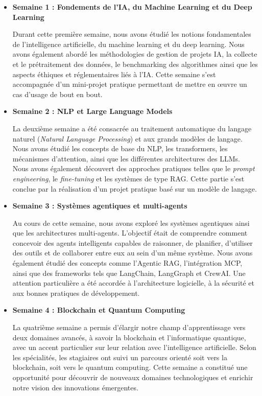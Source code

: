         \begin{itemize}
            \item \textbf{Semaine 1 : Fondements de l’IA, du Machine Learning et du Deep Learning}
        
            Durant cette première semaine, nous avons étudié les notions fondamentales de l’intelligence artificielle, du machine learning et du deep learning. Nous avons également abordé les méthodologies de gestion de projets IA, la collecte et le prétraitement des données, le benchmarking des algorithmes ainsi que les aspects éthiques et réglementaires liés à l’IA. Cette semaine s’est accompagnée d’un mini-projet pratique permettant de mettre en œuvre un cas d’usage de bout en bout.
        
            \item \textbf{Semaine 2 : NLP et Large Language Models}
        
            La deuxième semaine a été consacrée au traitement automatique du langage naturel (\textit{Natural Language Processing}) et aux grands modèles de langage. Nous avons étudié les concepts de base du NLP, les transformers, les mécanismes d’attention, ainsi que les différentes architectures des LLMs. Nous avons également découvert des approches pratiques telles que le \textit{prompt engineering}, le \textit{fine-tuning} et les systèmes de type RAG. Cette partie s’est conclue par la réalisation d’un projet pratique basé sur un modèle de langage.
        
            \item \textbf{Semaine 3 : Systèmes agentiques et multi-agents}
        
            Au cours de cette semaine, nous avons exploré les systèmes agentiques ainsi que les architectures multi-agents. L’objectif était de comprendre comment concevoir des agents intelligents capables de raisonner, de planifier, d’utiliser des outils et de collaborer entre eux au sein d’un même système. Nous avons également étudié des concepts comme l’Agentic RAG, l’intégration MCP, ainsi que des frameworks tels que LangChain, LangGraph et CrewAI. Une attention particulière a été accordée à l’architecture logicielle, à la sécurité et aux bonnes pratiques de développement.
        
            \item \textbf{Semaine 4 : Blockchain et Quantum Computing}
        
            La quatrième semaine a permis d’élargir notre champ d’apprentissage vers deux domaines avancés, à savoir la blockchain et l’informatique quantique, avec un accent particulier sur leur relation avec l’intelligence artificielle. Selon les spécialités, les stagiaires ont suivi un parcours orienté soit vers la blockchain, soit vers le quantum computing. Cette semaine a constitué une opportunité pour découvrir de nouveaux domaines technologiques et enrichir notre vision des innovations émergentes.
        \end{itemize}
